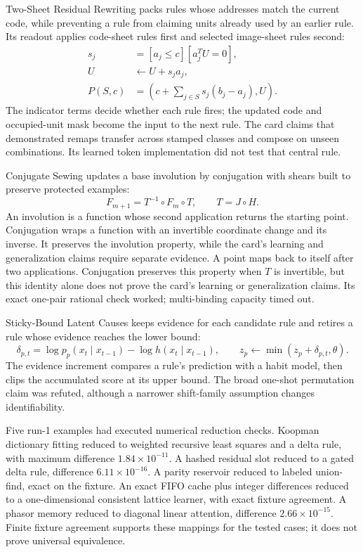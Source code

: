 Two-Sheet Residual Rewriting packs rules whose addresses match the current code, while preventing a rule from claiming units already used by an earlier rule. Its readout applies code-sheet rules first and selected image-sheet rules second:
\begin{equation}
\begin{aligned}
s_j&=[a_j\le c][a_j^TU=0],\\
U&\leftarrow U+s_ja_j,\\
P(S,c)&=\left(c+\sum_{j\in S}s_j(b_j-a_j),U\right).
\end{aligned}
\end{equation}
The indicator terms decide whether each rule fires; the updated code and occupied-unit mask become the input to the next rule. The card claims that demonstrated remaps transfer across stamped classes and compose on unseen combinations. Its learned token implementation did not test that central rule.

Conjugate Sewing updates a base involution by conjugation with shears built to preserve protected examples:
\begin{equation}
F_{m+1}=T^{-1}\circ F_m\circ T,\qquad T=J\circ H.
\end{equation}
An involution is a function whose second application returns the starting point. Conjugation wraps a function with an invertible coordinate change and its inverse. It preserves the involution property, while the card's learning and generalization claims require separate evidence. A point maps back to itself after two applications. Conjugation preserves this property when $T$ is invertible, but this identity alone does not prove the card's learning or generalization claims. Its exact one-pair rational check worked; multi-binding capacity timed out.

Sticky-Bound Latent Causes keeps evidence for each candidate rule and retires a rule whose evidence reaches the lower bound:
\begin{equation}
\delta_{p,t}=\log p_p(x_t\mid x_{t-1})-\log h(x_t\mid x_{t-1}),\qquad z_p\leftarrow\min(z_p+\delta_{p,t},\theta).
\end{equation}
The evidence increment compares a rule's prediction with a habit model, then clips the accumulated score at its upper bound. The broad one-shot permutation claim was refuted, although a narrower shift-family assumption changes identifiability.

Five run-1 examples had executed numerical reduction checks. Koopman dictionary fitting reduced to weighted recursive least squares and a delta rule, with maximum difference $1.84\times10^{-11}$. A hashed residual slot reduced to a gated delta rule, difference $6.11\times10^{-16}$. A parity reservoir reduced to labeled union-find, exact on the fixture. An exact FIFO cache plus integer differences reduced to a one-dimensional consistent lattice learner, with exact fixture agreement. A phasor memory reduced to diagonal linear attention, difference $2.66\times10^{-15}$. Finite fixture agreement supports these mappings for the tested cases; it does not prove universal equivalence.

